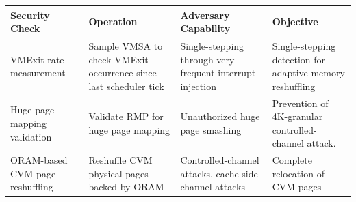 
\begin{tabularx}{\textwidth}{X X X X}

\toprule
\bf Security Check
& \bf Operation
& \bf Adversary Capability
& \bf Objective
\\\bottomrule


VMExit rate measurement
& Sample VMSA to check VMExit occurrence since last scheduler tick
& Single-stepping through very frequent interrupt injection
& Single-stepping detection for adaptive memory reshuffling
\\\midrule


Huge page mapping validation
& Validate RMP for huge page mapping 
& Unauthorized huge page smashing
& Prevention of 4K-granular controlled-channel attack.
\\\midrule


ORAM-based CVM page reshuffling
& Reshuffle CVM physical pages backed by ORAM
& Controlled-channel attacks, cache side-channel attacks
& Complete relocation of CVM pages
\\\bottomrule

\end{tabularx}